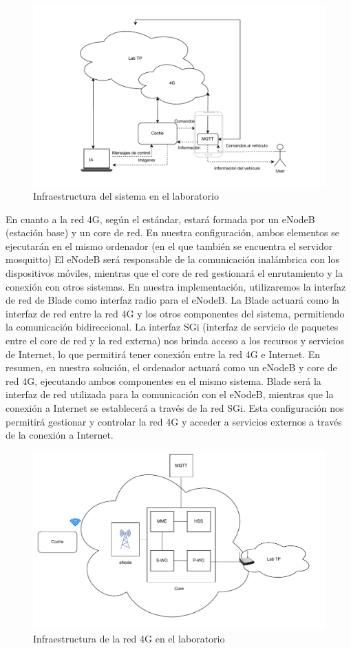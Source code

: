 \begin{figure}[H]
\centering
\includegraphics[width = \textwidth]{Imagenes/Solucion/12.pdf}
\caption{Infraestructura del sistema en el laboratorio}
\label{12}
\end{figure}

En cuanto a la red 4G, según el estándar, estará formada por un eNodeB (estación base) y un core de red. En nuestra configuración, ambos elementos se ejecutarán en el mismo ordenador (en el que también se encuentra el servidor mosquitto) El eNodeB será responsable de la comunicación inalámbrica con los dispositivos móviles, mientras que el core de red gestionará el enrutamiento y la conexión con otros sistemas.
En nuestra implementación, utilizaremos la interfaz de red de Blade como interfaz radio para el eNodeB. La Blade actuará como la interfaz de red entre la red 4G y los otros componentes del sistema, permitiendo la comunicación bidireccional.
La interfaz SGi (interfaz de servicio de paquetes entre el core de red y la red externa) nos brinda acceso a los recursos y servicios de Internet, lo que permitirá tener conexión entre la red 4G e Internet.
En resumen, en nuestra solución, el ordenador actuará como un eNodeB y core de red 4G, ejecutando ambos componentes en el mismo sistema. Blade será la interfaz de red utilizada para la comunicación con el eNodeB, mientras que la conexión a Internet se establecerá a través de la red SGi. Esta configuración nos permitirá gestionar y controlar la red 4G y acceder a servicios externos a través de la conexión a Internet.

\begin{figure}[H]
\centering
\includegraphics[width = \textwidth]{Imagenes/Solucion/11.pdf}
\caption{Infraestructura de la red 4G en el laboratorio}
\label{11}
\end{figure}

